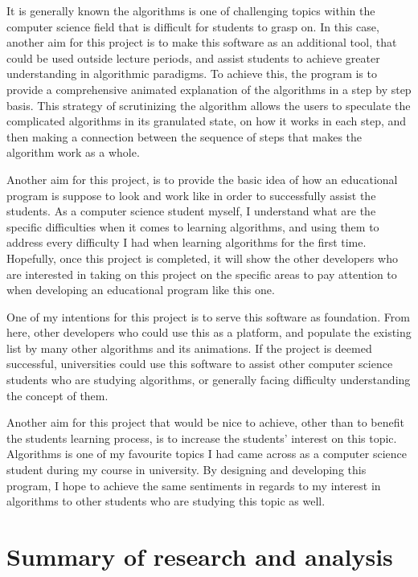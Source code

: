 It is generally known the algorithms is one of challenging topics within the computer science field that is difficult for students to grasp on. In this case, another aim for this project is to make this software as an additional tool, that could be used outside lecture periods, and assist students to achieve greater understanding in algorithmic paradigms. To achieve this, the program is to provide a comprehensive animated explanation of the algorithms in a step by step basis. 
This strategy of scrutinizing the algorithm allows the users to speculate the complicated algorithms in its granulated state, on how it works in each step, and then making a connection between the sequence of steps that makes the algorithm work as a whole.

Another aim for this project, is to provide the basic idea of how an educational program is suppose to look and work like in order to successfully assist the students. As a computer science student myself, I understand what are the specific difficulties when it comes to learning algorithms, and using them to address every difficulty I had when learning algorithms for the first time. Hopefully, once this project is completed, it will show the other developers who are interested in taking on this project on the specific areas to pay attention to when developing an educational program like this one. 

One of my intentions for this project is to serve this software as foundation. From here, other developers who could use this as a platform, and populate the existing list by many other algorithms and its animations. If the project is deemed successful, universities could use this software to assist other computer science students who are studying algorithms, or generally facing difficulty understanding the concept of them.

Another aim for this project that would be nice to achieve, other than to benefit the students learning process, is to increase the students' interest on this topic. Algorithms is one of my favourite topics I had came across as a computer science student during my course in university. By designing and developing this program, I hope to achieve the same sentiments in regards to my interest in algorithms to other students who are studying this topic as well.

\section{Summary of research and analysis}
